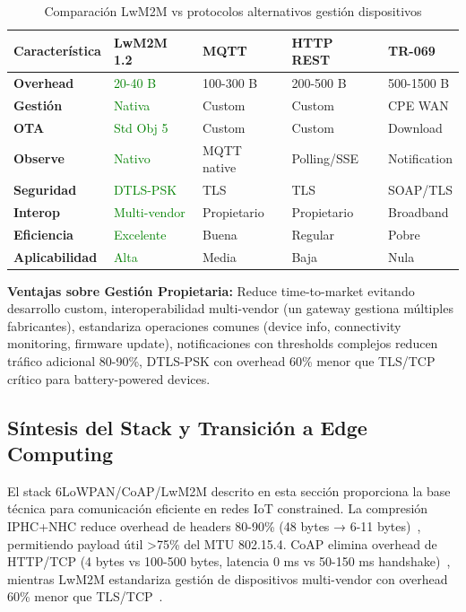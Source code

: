 \begin{table}[H]
\centering
\caption{Comparación LwM2M vs protocolos alternativos gestión dispositivos}
\label{tab:lwm2m-comparison}
\small
\begin{tabular}{|l|l|l|l|l|}
\hline
\rowcolor{blue!20}
\textbf{Característica} & \textbf{LwM2M 1.2} & \textbf{MQTT} & \textbf{HTTP REST} & \textbf{TR-069} \\
\hline
\textbf{Overhead} & \textcolor{green}{20-40 B} & 100-300 B & 200-500 B & 500-1500 B \\
\hline
\textbf{Gestión} & \textcolor{green}{Nativa} & Custom & Custom & CPE WAN \\
\hline
\textbf{OTA} & \textcolor{green}{Std Obj 5} & Custom & Custom & Download \\
\hline
\textbf{Observe} & \textcolor{green}{Nativo} & MQTT native & Polling/SSE & Notification \\
\hline
\textbf{Seguridad} & \textcolor{green}{DTLS-PSK} & TLS & TLS & SOAP/TLS \\
\hline
\textbf{Interop} & \textcolor{green}{Multi-vendor} & Propietario & Propietario & Broadband \\
\hline
\textbf{Eficiencia} & \textcolor{green}{Excelente} & Buena & Regular & Pobre \\
\hline
\textbf{Aplicabilidad} & \textcolor{green}{Alta} & Media & Baja & Nula \\
\hline
\end{tabular}
\end{table}

\textbf{Ventajas sobre Gestión Propietaria:} Reduce time-to-market evitando desarrollo custom, interoperabilidad multi-vendor (un gateway gestiona múltiples fabricantes), estandariza operaciones comunes (device info, connectivity monitoring, firmware update), notificaciones con thresholds complejos reducen tráfico adicional 80-90\%, DTLS-PSK con overhead 60\% menor que TLS/TCP crítico para battery-powered devices.

\subsection{Síntesis del Stack y Transición a Edge Computing}

El stack 6LoWPAN/CoAP/LwM2M descrito en esta sección proporciona la base técnica para comunicación eficiente en redes IoT constrained. La compresión IPHC+NHC reduce overhead de headers 80-90\% (48 bytes → 6-11 bytes)~\cite{abood6LoWPANTechnicalFeatures2024}, permitiendo payload útil >75\% del MTU 802.15.4. CoAP elimina overhead de HTTP/TCP (4 bytes vs 100-500 bytes, latencia 0 ms vs 50-150 ms handshake)~\cite{amezvaValdDesignImplementation2024}, mientras LwM2M estandariza gestión de dispositivos multi-vendor con overhead 60\% menor que TLS/TCP~\cite{bahardimanSecureHybridGateway2024}.

